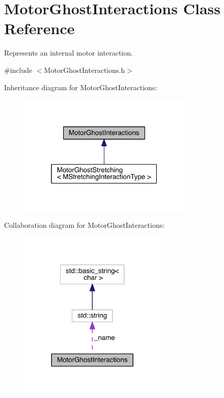 \hypertarget{classMotorGhostInteractions}{\section{Motor\+Ghost\+Interactions Class Reference}
\label{classMotorGhostInteractions}
}


Represents an internal motor interaction.  




{\ttfamily \#include $<$Motor\+Ghost\+Interactions.\+h$>$}



Inheritance diagram for Motor\+Ghost\+Interactions\+:\nopagebreak
\begin{figure}[H]
\begin{center}
\leavevmode
\includegraphics[width=235pt]{classMotorGhostInteractions__inherit__graph}
\end{center}
\end{figure}


Collaboration diagram for Motor\+Ghost\+Interactions\+:\nopagebreak
\begin{figure}[H]
\begin{center}
\leavevmode
\includegraphics[width=200pt]{classMotorGhostInteractions__coll__graph}
\end{center}
\end{figure}
